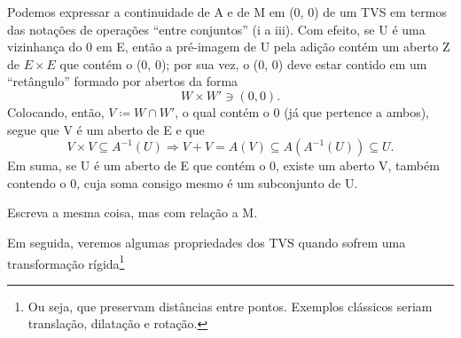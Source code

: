 \documentclass[../distribution_theory_notes.tex]{subfiles}
\begin{document}
Podemos expressar a continuidade de A e de M em (0, 0) de um TVS em termos das notações de operações ``entre conjuntos'' (i a iii). Com efeito, se U é uma vizinhança do 0 em E, então a pré-imagem de U pela adição contém um aberto Z de \(E\times E\) que contém o (0, 0);
por sua vez, o (0, 0) deve estar contido em um ``retângulo'' formado por abertos da forma
\[
	W\times W'\ni (0, 0).
\]
Colocando, então, \(V\coloneqq W\cap W'\), o qual contém o 0 (já que pertence a ambos), segue que V é um aberto de E e que
\[
	V\times V\subseteq A^{-1}(U)\Rightarrow V + V = A(V)\subseteq A(A^{-1}(U))\subseteq U.
\]
Em suma, se U é um aberto de E que contém o 0, existe um aberto V, também contendo o 0, cuja soma consigo mesmo é um subconjunto de U.
\begin{exr}
	Escreva a mesma coisa, mas com relação a M.
\end{exr}

Em seguida, veremos algumas propriedades dos TVS quando sofrem uma transformação rígida\footnote{Ou seja, que preservam distâncias entre pontos. Exemplos clássicos seriam translação, dilatação e rotação.}
\end{document}
